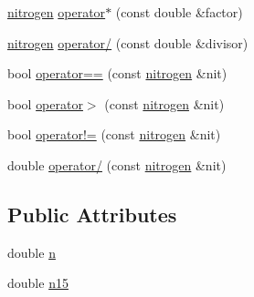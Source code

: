 \begin{DoxyCompactItemize}
\item 
\hyperlink{classnitrogen}{nitrogen} \hyperlink{classnitrogen_a8a735edcd947b58be5d4ca5f2cab4cdc}{operator$\ast$} (const double \&factor)
\item 
\hyperlink{classnitrogen}{nitrogen} \hyperlink{classnitrogen_a4e8a3471eb396100d47188f7d137d361}{operator/} (const double \&divisor)
\item 
bool \hyperlink{classnitrogen_ac9718e9f0f844022bf177b63f73d9205}{operator==} (const \hyperlink{classnitrogen}{nitrogen} \&nit)
\item 
bool \hyperlink{classnitrogen_a84fad71c0de01978912fda244f32672f}{operator$>$} (const \hyperlink{classnitrogen}{nitrogen} \&nit)
\item 
bool \hyperlink{classnitrogen_a94db6c475800d3030ebf24f2eb66e94f}{operator!=} (const \hyperlink{classnitrogen}{nitrogen} \&nit)
\item 
double \hyperlink{classnitrogen_a07f81b8595e3272a8a1ab1e27cdcc9d7}{operator/} (const \hyperlink{classnitrogen}{nitrogen} \&nit)
\end{DoxyCompactItemize}
\subsection*{Public Attributes}
\begin{DoxyCompactItemize}
\item 
double \hyperlink{classnitrogen_aa708078375ba23f1dd31e08e28269dac}{n}
\item 
double \hyperlink{classnitrogen_a2d537cc848da50f09b7580539f261dfc}{n15}
\end{DoxyCompactItemize}


